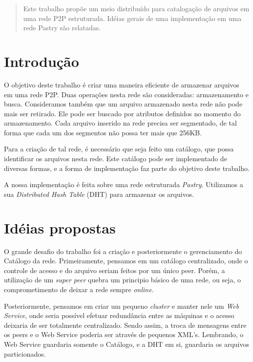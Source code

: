 \documentclass{acm_proc_article-sp}
\begin{document}

\maketitle
\begin{abstract}
Este trabalho propõe um meio distribuído para catalogação de arquivos em uma rede P2P estruturada. Idéias gerais de uma implementação em uma rede Pastry são relatadas.
\end{abstract}



\section{Introdução}

O objetivo deste trabalho é criar uma maneira eficiente de armazenar arquivos em uma rede P2P. Duas operações nesta rede são consideradas: armazenamento e busca. Consideramos também que um arquivo armazenado nesta rede não pode mais ser retirado. Ele pode ser buscado por atributos definidos no momento do armazenamento. Cada arquivo inserido na rede precisa ser segmentado, de tal forma que cada um dos segmentos não possa ter mais que 256KB.

Para a criação de tal rede, é necessário que seja feito um catálogo, que possa identificar os arquivos nesta rede. Este catálogo pode ser implementado de diversas formas, e a forma de implementação faz parte do objetivo deste trabalho.

A nossa implementação é feita sobre uma rede estruturada \textit{Pastry}. Utilizamos a sua \textit{Distributed Hash Table} (DHT) para armazenar os arquivos.

\section{Idéias propostas}
O grande desafio do trabalho foi a criação e posteriormente o gerenciamento do Catálogo da rede. Primeiramente, pensamos em um catálogo centralizado, onde o controle de acesso e do arquivo seriam feitos por um único peer.  Porém, a utilização de um \textit{super peer} quebra um principio básico de uma rede, ou seja, o comprometimento de deixar a rede sempre \textit{online}.

Posteriormente, pensamos em criar um pequeno \textit{cluster} e manter nele um \textit{Web Service}, onde seria possível efetuar redundância entre as máquinas e o acesso deixaria de ser totalmente centralizado. Sendo assim, a troca de mensagens entre os peers e o Web Service poderia ser através de pequenos XML's. Lembrando, o Web Service guardaria somente o Catálogo, e a DHT em si, guardaria os arquivos particionados.
\end{document}
